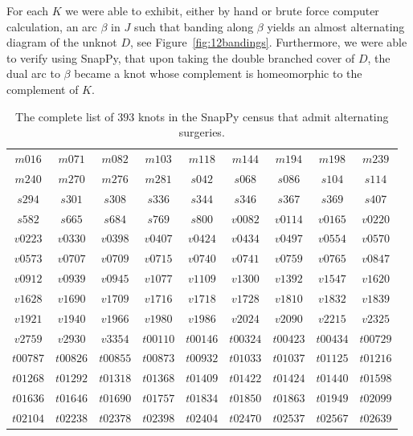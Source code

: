 \documentclass{amsart} %
\theoremstyle{thm}
\theoremstyle{definition}
\numberwithin{equation}{section}
\begin{document}
For each $K$ we were able to exhibit, either by hand or brute force computer calculation, an arc $\beta$ in $J$ such that banding along $\beta$ yields an almost alternating diagram of the unknot $D$, see Figure~\ref{fig:12bandings}. Furthermore, we were able to verify using SnapPy, that upon taking the double branched cover of $D$, the dual arc to $\beta$ became a knot whose complement is homeomorphic to the complement of $K$.

\begin{table}[htbp]
	\caption{The complete list of $393$ knots in the SnapPy census that admit alternating surgeries.}
	\label{tab:knots_with_alternating_surgeries}
{\tiny
	\begin{tabular}{ccccccccc}
\toprule	
$m016$&
 $m071$&
 $m082$&
 $m103$&
 $m118$&
 $m144$&
 $m194$&
 $m198$&
 $m239$\\
 $m240$&
 $m270$&
 $m276$&
 $m281$&
  $s042$&
 $s068$&
 $s086$&
 $s104$&
 $s114$\\
 $s294$&
 $s301$&
 $s308$&
 $s336$&
 $s344$&
 $s346$&
 $s367$&
 $s369$&
 $s407$\\
 $s582$&
 $s665$&
 $s684$&
 $s769$&
 $s800$&
 $v0082$&
 $v0114$&
 $v0165$&
 $v0220$\\
 $v0223$&
 $v0330$&
 $v0398$&
 $v0407$&
 $v0424$&
 $v0434$&
 $v0497$&
 $v0554$&
 $v0570$\\
 $v0573$&
 $v0707$&
 $v0709$&
 $v0715$&
 $v0740$&
 $v0741$&
 $v0759$&
 $v0765$&
 $v0847$\\
 $v0912$&
 $v0939$&
 $v0945$&
 $v1077$&
 $v1109$&
 $v1300$&
 $v1392$&
 $v1547$&
 $v1620$\\
 $v1628$&
 $v1690$&
 $v1709$&
 $v1716$&
 $v1718$&
 $v1728$&
 $v1810$&
 $v1832$&
 $v1839$\\
 $v1921$&
 $v1940$&
 $v1966$&
 $v1980$&
 $v1986$&
 $v2024$&
 $v2090$&
 $v2215$&
 $v2325$\\
 $v2759$&
 $v2930$&
 $v3354$&
 $t00110$&
 $t00146$&
 $t00324$&
 $t00423$&
 $t00434$&
 $t00729$\\
 $t00787$&
 $t00826$&
 $t00855$&
 $t00873$&
 $t00932$&
 $t01033$&
 $t01037$&
 $t01125$&
 $t01216$\\
 $t01268$&
 $t01292$&
 $t01318$&
 $t01368$&
 $t01409$&
 $t01422$&
 $t01424$&
 $t01440$&
 $t01598$\\
 $t01636$&
 $t01646$&
 $t01690$&
 $t01757$&
 $t01834$&
 $t01850$&
 $t01863$&
 $t01949$&
 $t02099$\\
 $t02104$&
 $t02238$&
 $t02378$&
 $t02398$&
 $t02404$&
 $t02470$&
 $t02537$&
 $t02567$&
 $t02639$\\

\end{tabular}}
\end{table}
\end{document}
